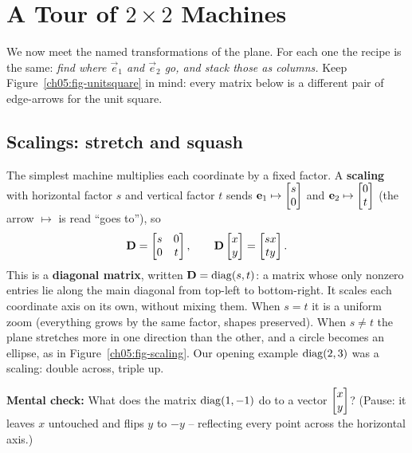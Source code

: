 \section{A Tour of $2\times 2$ Machines}
\label{ch05:tour}

We now meet the named transformations of the plane. For each one the recipe is
the same: \emph{find where $\vec{e}_1$ and $\vec{e}_2$ go,
and stack those as columns.} Keep Figure~\ref{ch05:fig-unitsquare} in mind:
every matrix below is a different pair of edge-arrows for the unit square.

\subsection{Scalings: stretch and squash}
\label{ch05:scalings}

The simplest machine multiplies each coordinate by a fixed factor. A
\textbf{scaling} with horizontal factor $s$ and vertical factor $t$ sends
$\mathbf{e}_1 \mapsto \begin{bmatrix}s\\0\end{bmatrix}$ and $\mathbf{e}_2 \mapsto \begin{bmatrix}0\\t\end{bmatrix}$ (the arrow
$\mapsto$ is read ``goes to''), so
\[
  \mathbf{D} = \begin{bmatrix} s & 0 \\ 0 & t \end{bmatrix},
  \qquad
  \mathbf{D}\begin{bmatrix}x\\y\end{bmatrix} = \begin{bmatrix}sx\\ty\end{bmatrix}.
\]
This is a \textbf{diagonal matrix}, written $\mathbf{D} = \operatorname{diag}(s,t)$: a matrix whose only
nonzero entries lie along the main diagonal from top-left to bottom-right.
It scales each coordinate axis on its own, without mixing them. When
$s = t$ it is a uniform zoom (everything grows by the same factor, shapes
preserved). When $s \neq t$ the plane stretches more in one direction than the
other, and a circle becomes an ellipse, as in Figure~\ref{ch05:fig-scaling}. Our
opening example $\operatorname{diag}(2,3)$ was a scaling: double across, triple up.

\begin{recoverybox}
\textbf{Mental check:} What does the matrix $\operatorname{diag}(1,-1)$ do to a vector $\begin{bmatrix}x\\y\end{bmatrix}$?
(Pause: it leaves $x$ untouched and flips $y$ to $-y$ -- reflecting every point
across the horizontal axis.)
\end{recoverybox}

